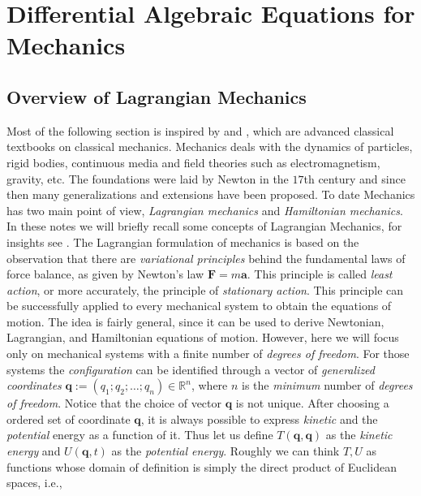 %
%

\chapter{Differential Algebraic Equations for Mechanics}
	\label{ch:overview}
	\section{Overview of Lagrangian Mechanics}
		\label{sec:overview}
		Most of the following section is inspired by \cite{arnold1989mathematical} 
		and \cite{marsden2013introduction}, which are advanced classical textbooks 
		on classical mechanics.
		Mechanics deals with the dynamics of particles, rigid bodies, 
		continuous media and field theories such as electromagnetism, 
		gravity, etc.
		The foundations were laid by Newton in the $17$th century and since then 
		many generalizations and extensions have been proposed.
		To date Mechanics has two main point of view, \emph{Lagrangian mechanics} 
		and \emph{Hamiltonian mechanics}.
		In these notes we will briefly recall some concepts of Lagrangian Mechanics, 
		for insights see \cite{marsden2013introduction}.
		The Lagrangian formulation of mechanics is based on the observation
		that there are \emph{variational principles} behind the fundamental
		laws of force balance, as given by Newton's law $\bm{F}=m\bm{a}$.
		This principle is called \emph{least action}, or more accurately,
		the principle of \emph{stationary action}.
		This principle can be successfully applied to every mechanical 
		system to obtain the equations of motion.
		The idea is fairly general, since it can be used to derive Newtonian, 
		Lagrangian, and Hamiltonian equations of motion.
		However, here we will focus only on mechanical systems with a 
		finite number of \emph{degrees of freedom}.
		For those systems the \emph{configuration} can be identified through a
		vector of \emph{generalized coordinates} 
		$\bm{q} := (q_{1}; q_{2}; \dots ;q_{n})\in\mathbb{R}^{n}$, 
		where $n$ is the \emph{minimum} number of \emph{degrees of freedom}.
		Notice that the choice of vector $\bm{q}$ is not unique.
		After choosing a ordered set of coordinate $\bm{q}$,
		it is always possible to express \emph{kinetic} and the \emph{potential}
		energy as a function of it. Thus let us define $T(\bm{q},\bm{q})$ as the
		\emph{kinetic energy} and $U(\bm{q},t)$ as the \emph{potential energy}.
		Roughly we can think $T, U$ as functions whose domain of definition
		is simply the direct product of Euclidean spaces, i.e., 
